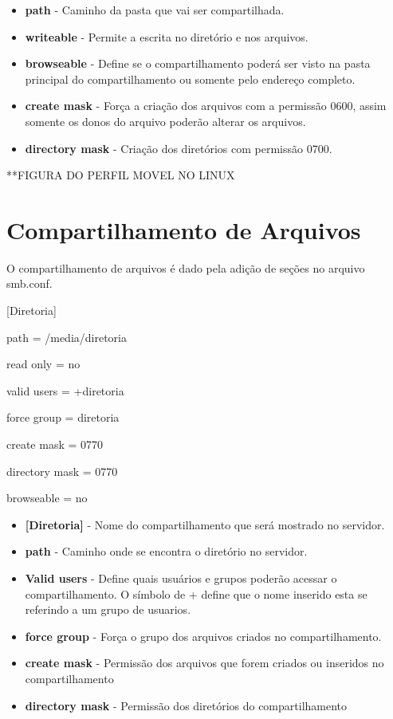 \begin{itemize}
	\item \textbf {path} - Caminho da pasta que vai ser compartilhada.
	\item \textbf {writeable} - Permite a escrita no diretório e nos arquivos.
	\item \textbf {browseable} - Define se o compartilhamento poderá ser visto na pasta principal do compartilhamento ou somente pelo endereço completo.
	\item \textbf {create mask} - Força a criação dos arquivos com a permissão 0600, assim somente os donos do arquivo poderão alterar os arquivos.
	\item \textbf {directory mask} - Criação dos diretórios com permissão 0700.
\end{itemize}

**FIGURA DO PERFIL MOVEL NO LINUX

\section{Compartilhamento de Arquivos}

O compartilhamento de arquivos é dado pela adição de seções no arquivo smb.conf.

[Diretoria]

path = /media/diretoria

read only = no

valid users = +diretoria

force group = diretoria

create mask = 0770

directory mask = 0770

browseable = no

\begin{itemize}
	\item \textbf{[Diretoria]} - Nome do compartilhamento que será mostrado no servidor.
	\item \textbf{path} - Caminho onde se encontra o diretório no servidor.
	\item \textbf{Valid users} - Define quais usuários e grupos poderão acessar o compartilhamento. O símbolo de + define que o nome inserido esta se referindo a um grupo de usuarios.
	\item \textbf{force group} - Força o grupo dos arquivos criados no compartilhamento.
	\item \textbf{create mask} - Permissão dos arquivos que forem criados ou inseridos no compartilhamento
	\item \textbf{directory mask} - Permissão dos diretórios do compartilhamento
\end{itemize}

